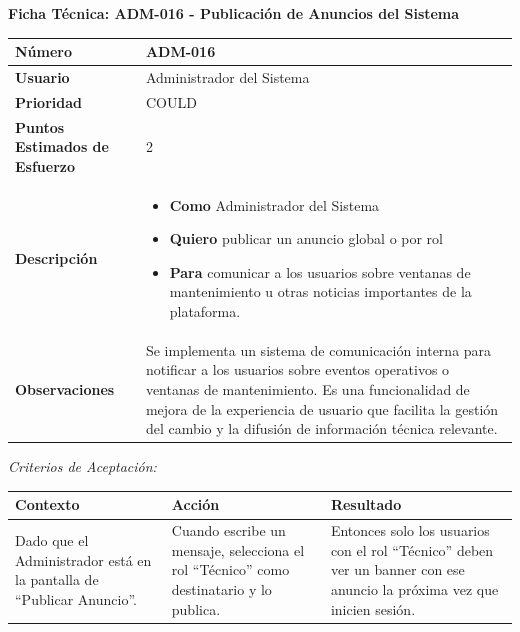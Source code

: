 \vspace{1em}
\noindent\textbf{Ficha Técnica: ADM-016 - Publicación de Anuncios del Sistema}
\footnotesize\setlength{\tabcolsep}{4pt}\renewcommand{\arraystretch}{1.2}
\begin{longtable}{|p{0.21\textwidth}|p{0.74\textwidth}|}\hline
\textbf{Número} & ADM-016 \\ \hline
\textbf{Usuario} & Administrador del Sistema \\ \hline
\textbf{Prioridad} & COULD \\ \hline
\textbf{Puntos Estimados de Esfuerzo} & 2 \\ \hline
\textbf{Descripción} & \parbox[t]{\linewidth}{\vspace{2pt}\begin{itemize}[leftmargin=1.5em, nosep, topsep=0pt]
\item \textbf{Como} Administrador del Sistema
\item \textbf{Quiero} publicar un anuncio global o por rol
\item \textbf{Para} comunicar a los usuarios sobre ventanas de mantenimiento u otras noticias importantes de la plataforma.
\end{itemize}\vspace{2pt}} \\ \hline
\textbf{Observaciones} & Se implementa un sistema de comunicación interna para notificar a los usuarios sobre eventos operativos o ventanas de mantenimiento. Es una funcionalidad de mejora de la experiencia de usuario que facilita la gestión del cambio y la difusión de información técnica relevante. \\ \hline
\end{longtable}\normalsize
\noindent\textit{Criterios de Aceptación:}
\footnotesize\begin{longtable}{|p{0.28\textwidth}|p{0.32\textwidth}|p{0.34\textwidth}|}\hline
\textbf{Contexto} & \textbf{Acción} & \textbf{Resultado} \\ \hline
\parbox[t]{\linewidth}{Dado que el Administrador está en la pantalla de ``Publicar Anuncio''.} & \parbox[t]{\linewidth}{Cuando escribe un mensaje, selecciona el rol ``Técnico'' como destinatario y lo publica.} & \parbox[t]{\linewidth}{Entonces solo los usuarios con el rol ``Técnico'' deben ver un banner con ese anuncio la próxima vez que inicien sesión.} \\ \hline
\end{longtable}\normalsize
\vspace{1em}
